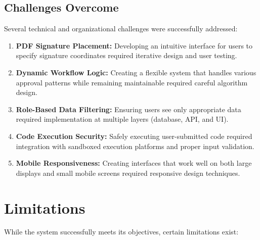 \subsection{Challenges Overcome}

Several technical and organizational challenges were successfully addressed:

\begin{enumerate}
\item \textbf{PDF Signature Placement:} Developing an intuitive interface for users to specify signature coordinates required iterative design and user testing.

\item \textbf{Dynamic Workflow Logic:} Creating a flexible system that handles various approval patterns while remaining maintainable required careful algorithm design.

\item \textbf{Role-Based Data Filtering:} Ensuring users see only appropriate data required implementation at multiple layers (database, API, and UI).

\item \textbf{Code Execution Security:} Safely executing user-submitted code required integration with sandboxed execution platforms and proper input validation.

\item \textbf{Mobile Responsiveness:} Creating interfaces that work well on both large displays and small mobile screens required responsive design techniques.
\end{enumerate}

\section{Limitations}

While the system successfully meets its objectives, certain limitations exist:

